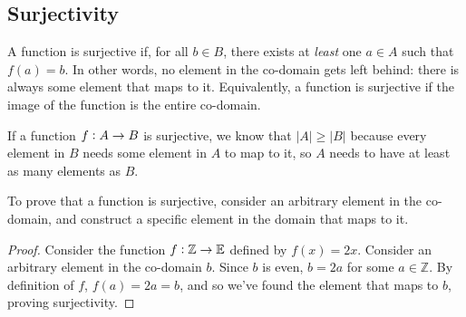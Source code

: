 \documentclass[12pt,letterpaper]{article}
\newcommand\Z{\mathbb Z}
\begin{document}
    \subsection{Surjectivity}
    A function is surjective if, for all $b \in B$, there exists at \textit{least} one $a \in A$ such that $f(a) = b$. In other words, no element in the co-domain gets left behind: there is always some element that maps to it. Equivalently, a function is surjective if the image of the function is the entire co-domain.
    
    If a function $f \vcentcolon A \rightarrow B$ is surjective, we know that $|A| \geq |B|$ because every element in $B$ needs some element in $A$ to map to it, so $A$ needs to have at least as many elements as $B$.
    
    \begin{figure}[h]
     \centering
    \end{figure}
    
    To prove that a function is surjective, consider an arbitrary element in the co-domain, and construct a specific element in the domain that maps to it.
    
    \begin{mdframed}
    \begin{proof}
    Consider the function $f \vcentcolon \Z \rightarrow \mathbb{E}$ defined by $f(x) = 2x$. Consider an arbitrary element in the co-domain $b$. Since $b$ is even, $b = 2a$ for some $a \in \Z$. By definition of $f$, $f(a) = 2a = b$, and so we've found the element that maps to $b$, proving surjectivity.
    \end{proof}
    \end{mdframed}
    
\end{document}
